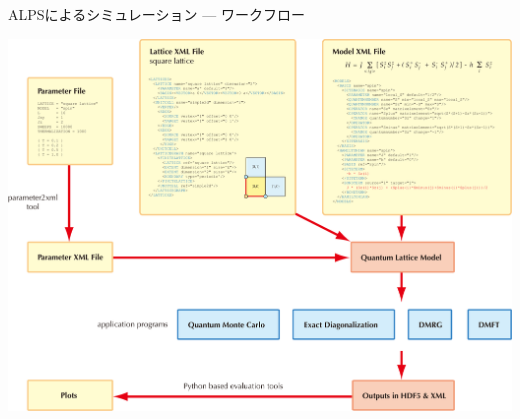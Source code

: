 \begin{frame}{ALPSによるシミュレーション --- ワークフロー}
  \begin{center}
    \includegraphics[height=0.8\textheight]{workflow.pdf}
  \end{center}
\end{frame}


